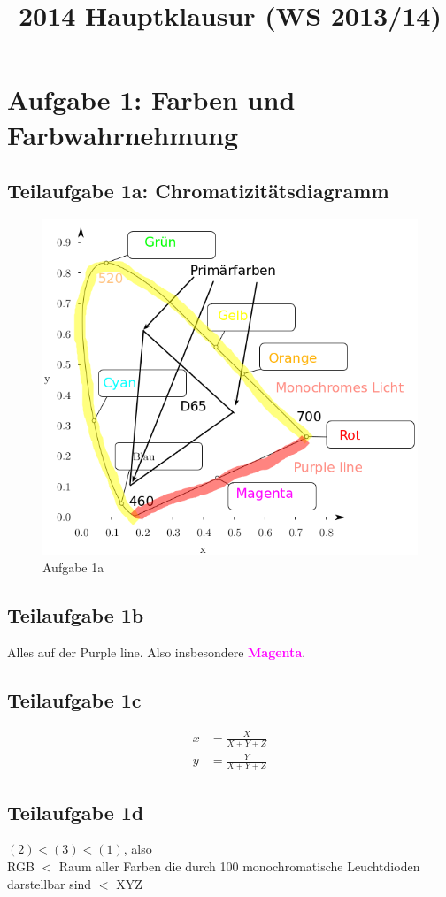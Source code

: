 \documentclass[a4paper]{scrartcl}
\begin{document}
\title{2014 Hauptklausur (WS 2013/14)}

\setcounter{section}{1}
\section*{Aufgabe 1: Farben und Farbwahrnehmung}
\subsection*{Teilaufgabe 1a: Chromatizitätsdiagramm}
\begin{figure}[h]
    \centering
    \includegraphics*[width=0.8\linewidth, keepaspectratio]{1a.png}
    \caption{Aufgabe 1a}
    \label{fig:1a}
\end{figure}

\subsection*{Teilaufgabe 1b}
Alles auf der Purple line. Also insbesondere \textcolor{magenta}{\textbf{Magenta}}.

\subsection*{Teilaufgabe 1c}
\begin{align}
    x &= \frac{X}{X + Y + Z}\\
    y &= \frac{Y}{X + Y + Z}
\end{align}

\subsection*{Teilaufgabe 1d}
$(2) < (3) < (1)$, also\\
RGB $<$ Raum aller Farben die durch 100 monochromatische Leuchtdioden darstellbar sind $<$ XYZ
\end{document}
